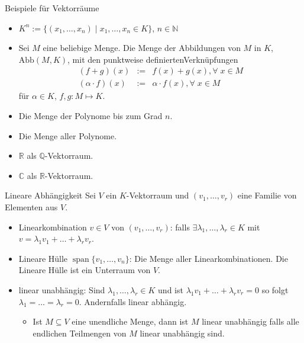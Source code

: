 \documentclass[notes=hide,hyperref={dvipdfmx,pdfpagelabels=false}]{beamer}
\begin{document}
\begin{frame}{Beispiele für Vektorräume}
\begin{itemize}
\item $K^n := \{(x_1,\ldots,x_n) \;|\; x_1, \ldots, x_n \in K\}$, $n \in \mathbb{N}$
\item Sei $M$ eine beliebige Menge. Die Menge der Abbildungen von $M$
  in $K$, $\text{Abb}(M,K)$, mit den punktweise definiertenVerknüpfungen
\begin{eqnarray*}
(f+g)(x) & :=& f(x)+g(x), \forall\; x \in M\\
(\alpha \cdot f)(x) & :=& \alpha \cdot f(x), \forall\; x \in M  
\end{eqnarray*}
für $\alpha \in K$, $f,g:M \mapsto K$.
\item Die Menge der Polynome bis zum Grad $n$.
\item Die Menge aller Polynome.
\item $\mathbb{R}$ als $\mathbb{Q}$-Vektorraum.
\item $\mathbb{C}$ als $\mathbb{R}$-Vektorraum.
\end{itemize}
\end{frame} 



\begin{frame}{Lineare Abhängigkeit}
Sei $V$ ein $K$-Vektorraum und $(v_1,\dots ,v_r)$ eine Familie von
Elementen aus $V$.
\begin{itemize}
\item {\color{red} Linearkombination} $v \in V$ von $(v_1,\dots ,v_r)$: 
  falls $\exists \lambda_1, \dots, \lambda_r \in K$  mit
  $ v= \lambda_1 v_1 + \dots + \lambda_r v_r$. 
\item {\color{red} Lineare Hülle} $\mathop{span}\{v_1, \dots, v_n\}$: Die Menge aller Linearkombinationen. Die Lineare
  Hülle ist ein Unterraum von $V$.
\item {\color{red} linear unabhängig}: 
  Sind $\lambda_1, \dots , \lambda_r \in K$ und ist $\lambda_1 v_1 +
  \dots + \lambda_r v_r=0$ so folgt $\lambda_1= \dots =
  \lambda_r=0$. Andernfalls {\color{red} linear abhängig}. 
\begin{itemize}
\item Ist $M \subseteq V$ eine unendliche Menge, dann ist $M$ linear unabhängig falls alle endlichen Teilmengen von $M$ linear unabhängig sind.
\end{itemize}
\end{itemize}
\end{frame}
\end{document}
